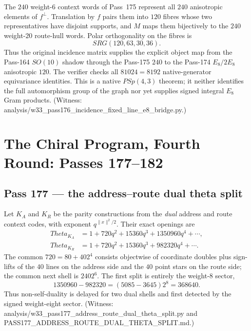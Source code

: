 \documentclass[12pt,a4paper]{article}
\def\mathrm#1{#1}%
\def\texttt#1{#1}%
\def\Theta{Theta}%
\def\cdot{ }%
\theoremstyle{definition}
\newcommand{\SRG}{\mathrm{SRG}}
\newcommand{\PSp}{\mathrm{PSp}}
\begin{document}
The $240$ weight-$6$ context words of Pass~175 represent all $240$
anisotropic elements of $f^\perp$.  Translation by $f$ pairs them into
$120$ fibres whose two representatives have disjoint supports, and $M$
maps them bijectively to the $240$ weight-$20$ route-hull words.  Polar
orthogonality on the fibres is
\[
 \boxed{\SRG(120,63,30,36)}.
\]
Thus the original incidence matrix supplies the explicit object map from
the Pass-164 $\mathrm{SO}(10)$ shadow through the Pass-175 $240$ to the
Pass-174 $E_8/2E_8$ anisotropic $120$.  The verifier checks all
$8\cdot1024=8192$ native-generator equivariance identities.  This is a
native $\PSp(4,3)$ theorem; it neither identifies the full automorphism
group of the graph nor yet supplies signed integral $E_8$ Gram products.
(Witness:
\texttt{analysis/w33\_pass176\_incidence\_fixed\_line\_e8\_bridge.py}.)

\section{The Chiral Program, Fourth Round: Passes 177--182}
\label{sec:chiral-program-four}

\subsection{Pass 177 --- the address--route dual theta split}
\label{ssec:pass177}

Let $K_A$ and $K_R$ be the parity constructions from the \emph{dual}
address and route context codes, with exponent $q^{\lVert x\rVert^2/2}$.
Their exact openings are
\[
\begin{aligned}
\Theta_{K_A}&=1+720q^2+15360q^3+1350960q^4+\cdots,\\
\Theta_{K_R}&=1+720q^2+15360q^3+ 982320q^4+\cdots.
\end{aligned}
\]
The common $720=80+40\cdot2^4$ consists objectwise of coordinate doubles
plus sign-lifts of the $40$ lines on the address side and the $40$ point
stars on the route side; the common next shell is $240\cdot2^6$.  The
first split is entirely the weight-$8$ sector,
\[
1350960-982320=(5085-3645)2^8=\boxed{368640}.
\]
Thus non-self-duality is delayed for two dual shells and first detected
by the signed weight-eight sector. (Witness:
\texttt{analysis/w33\_pass177\_address\_route\_dual\_theta\_split.py}
and \texttt{PASS177\_ADDRESS\_ROUTE\_DUAL\_THETA\_SPLIT.md}.)
\end{document}
